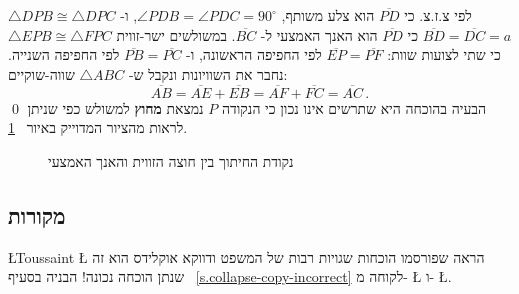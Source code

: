$\triangle DPB\cong \triangle DPC$
לפי צ.ז.צ. כי 
$\overline{PD}$
הוא צלע משותף, 
$\angle PDB=\angle PDC=90^\circ$,
ו-%
$\overline{BD}=\overline{DC}=a$
כי 
$\overline{PD}$
הוא האנך האמצעי ל-%
$\overline{BC}$.
במשולשים ישר-זווית
$\triangle EPB\cong \triangle FPC$
כי שתי לצועות שוות:
$\overline{EP}=\overline{PF}$
לפי החפיפה הראשונה, ו-%
$\overline{PB}=\overline{PC}$
לפי החפיפה השנייה. נחבר את השוויונות ונקבל ש-%
$\triangle ABC$
שווה-שוקיים:
\[
\overline{AB}=\overline{AE}+\overline{EB}=\overline{AF}+\overline{FC}=\overline{AC}\,.
\]
\qed
הבעיה בהוכחה היא שתרשים אינו נכון כי הנקודה
$P$
נמצאת
\textbf{מחוץ}
למשולש כפי שניתן לראות מהציור המדוייק באיור%
~\ref{f.isoceles-wrong}.
\begin{figure}[htb]
\begin{center}
\end{center}
\caption{נקודת החיתוך בין חוצה הזווית והאנך האמצעי}\label{f.isoceles-wrong}
\end{figure}



\subsection*{מקורות}

\L{Toussaint} \L{\cite{toussaint}}
הראה שפורסמו הוכחות שגויות רבות של המשפט ודווקא אוקלידס הוא זה שנתן הוכחה נכונה! הבניה בסעיף~%
\ref{s.collapse-copy-incorrect}
לקוחה מ-%
\L{\cite{rusty}}
ו-%
\L{\cite{toussaint}}.
